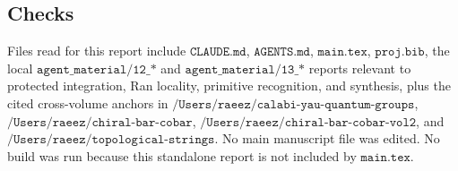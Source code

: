 \subsection{Checks}

Files read for this report include \(\texttt{CLAUDE.md}\),
\(\texttt{AGENTS.md}\), \(\texttt{main.tex}\), \(\texttt{proj.bib}\),
the local \(\texttt{agent\_material/12\_*}\) and
\(\texttt{agent\_material/13\_*}\) reports relevant to protected
integration, Ran locality, primitive recognition, and synthesis, plus
the cited cross-volume anchors in
\(\texttt{/Users/raeez/calabi-yau-quantum-groups}\),
\(\texttt{/Users/raeez/chiral-bar-cobar}\),
\(\texttt{/Users/raeez/chiral-bar-cobar-vol2}\), and
\(\texttt{/Users/raeez/topological-strings}\).  No main manuscript file
was edited.  No build was run because this standalone report is not
included by \(\texttt{main.tex}\).
